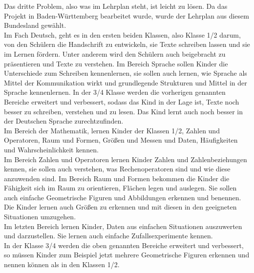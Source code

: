 Das dritte Problem, also was im Lehrplan steht, ist leicht zu lösen. Da das Projekt in Baden-Württemberg bearbeitet wurde, wurde der Lehrplan aus diesem Bundesland gewählt.\\
Im Fach Deutsch, geht es in den ersten beiden Klassen, also Klasse 1/2 darum, von den Schülern die Handschrift zu entwickeln, sie Texte schreiben lassen und sie im Lernen fördern. Unter anderem wird den Schülern auch beigebracht zu präsentieren und Texte zu verstehen. Im Bereich Sprache sollen Kinder die Unterschiede zum Schreiben kennenlernen, sie sollen auch lernen, wie Sprache als Mittel der Kommunikation wirkt und grundlegende Strukturen und Mittel in der Sprache kennenlernen. In der 3/4 Klasse werden die vorherigen genannten Bereiche erweitert und verbessert, sodass das Kind in der Lage ist, Texte noch besser zu schreiben, verstehen und zu lesen. Das Kind lernt auch noch besser in der Deutschen Sprache zurechtzufinden.\\
Im Bereich der Mathematik, lernen Kinder der Klassen 1/2, Zahlen und Operatoren, Raum und Formen, Größen und Messen und Daten, Häufigkeiten und Wahrscheinlichkeit kennen.\\
Im Bereich Zahlen und Operatoren lernen Kinder Zahlen und Zahlenbeziehungen kennen, sie sollen auch verstehen, was Rechenoperatoren sind und wie diese anzuwenden sind. Im Bereich Raum und Formen bekommen die Kinder die Fähigkeit sich im Raum zu orientieren, Flächen legen und auslegen. Sie sollen auch einfache Geometrische Figuren und Abbildungen erkennen und benennen.\\
Die Kinder lernen auch Größen zu erkennen und mit diesen in den geeigneten Situationen umzugehen.\\
Im letzten Bereich lernen Kinder, Daten aus einfachen Situationen auszuwerten und darzustellen. Sie lernen auch einfache Zufallsexperimente kennen. 
\\
In der Klasse 3/4 werden die oben genannten Bereiche erweitert und verbessert, so müssen Kinder zum Beispiel jetzt mehrere Geometrische Figuren erkennen und nennen können als in den Klassen 1/2. \\

